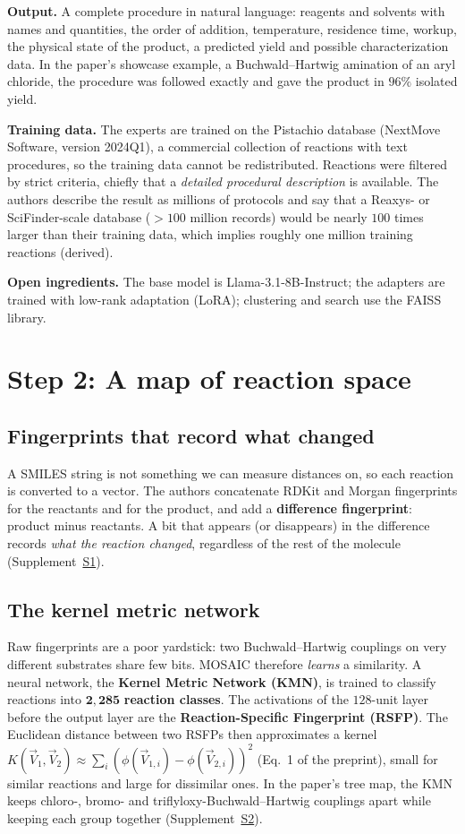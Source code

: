 \documentclass[11pt]{article}
\begin{document}
\textbf{Output.} A complete procedure in natural language: reagents and solvents with names and quantities, the order of addition, temperature, residence time, workup, the physical state of the product, a predicted yield and possible characterization data. In the paper's showcase example, a Buchwald--Hartwig amination of an aryl chloride, the procedure was followed exactly and gave the product in $96\%$ isolated yield.

\textbf{Training data.} The experts are trained on the Pistachio database (NextMove Software, version 2024Q1), a commercial collection of reactions with text procedures, so the training data cannot be redistributed. Reactions were filtered by strict criteria, chiefly that a \emph{detailed procedural description} is available. The authors describe the result as millions of protocols and say that a Reaxys- or SciFinder-scale database ($>100$ million records) would be nearly $100$ times larger than their training data, which implies roughly one million training reactions (derived).

\textbf{Open ingredients.} The base model is Llama-3.1-8B-Instruct; the adapters are trained with low-rank adaptation (LoRA); clustering and search use the FAISS library.

\section{Step 2: A map of reaction space}
\subsection*{Fingerprints that record what changed}
A SMILES string is not something we can measure distances on, so each reaction is converted to a vector. The authors concatenate RDKit and Morgan fingerprints for the reactants and for the product, and add a \textbf{difference fingerprint}: product minus reactants. A bit that appears (or disappears) in the difference records \emph{what the reaction changed}, regardless of the rest of the molecule (Supplement~\hyperref[sec:S1]{S1}).

\subsection*{The kernel metric network}
Raw fingerprints are a poor yardstick: two Buchwald--Hartwig couplings on very different substrates share few bits. MOSAIC therefore \emph{learns} a similarity. A neural network, the \textbf{Kernel Metric Network (KMN)}, is trained to classify reactions into $\mathbf{2{,}285}$ \textbf{reaction classes}. The activations of the $128$-unit layer before the output layer are the \textbf{Reaction-Specific Fingerprint (RSFP)}. The Euclidean distance between two RSFPs then approximates a kernel $K(\vec V_1,\vec V_2)\approx\sum_i(\phi(\vec V_{1,i})-\phi(\vec V_{2,i}))^2$ (Eq.~1 of the preprint), small for similar reactions and large for dissimilar ones. In the paper's tree map, the KMN keeps chloro-, bromo- and triflyloxy-Buchwald--Hartwig couplings apart while keeping each group together (Supplement~\hyperref[sec:S2]{S2}).
\end{document}
